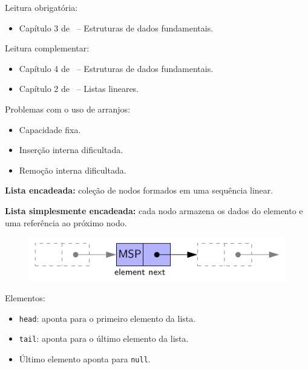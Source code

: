 \newcommand{\templatesdir}{../../../templates}
\newcommand{\template}{template-roteiro-est}


\newcommand{\content}{Estruturas de dados fundamentais}
\newcommand{\class}{Algoritmos e Estruturas de Dados}
\newcommand{\shortcourse}{45EST}



\makeheader

{
Leitura obrigatória:
\begin{itemize}
	\item Capítulo 3 de~\cite{GoodrichEtAl2014} -- Estruturas de dados fundamentais.
\end{itemize}

Leitura complementar:
\begin{itemize}
	\item Capítulo 4 de~\cite{Preiss2001} -- Estruturas de dados fundamentais.
	\item Capítulo 2 de~\cite{Pereira2008} -- Listas lineares.
\end{itemize}
}

\medskip


Problemas com o uso de arranjos:
\begin{itemize}
	\item Capacidade fixa.
	\item Inserção interna dificultada.
	\item Remoção interna dificultada.
\end{itemize}

\medskip

\textbf{Lista encadeada:} coleção de nodos formados em uma sequência linear.

\textbf{Lista simplesmente encadeada:} cada nodo armazena os dados do elemento e uma referência ao próximo nodo.

\begin{figure}[H]
	\centering
	\includegraphics[width=0.7\linewidth]{img/figure-3-10}
\end{figure}

Elementos:
\begin{itemize}
	\item \texttt{head}: aponta para o primeiro elemento da lista.
	\item \texttt{tail}: aponta para o último elemento da lista.
	\item Último elemento aponta para \texttt{null}.
\end{itemize}

